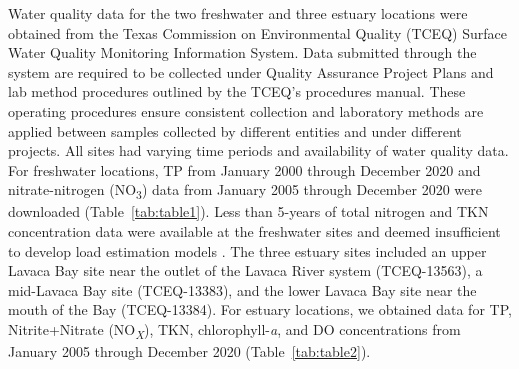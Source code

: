 \documentclass[fleqn,10pt,lineno]{wlpeerj} %
\begin{document}
Water quality data for the two freshwater and three estuary locations
were obtained from the Texas Commission on Environmental Quality (TCEQ)
Surface Water Quality Monitoring Information System. Data submitted
through the system are required to be collected under Quality Assurance
Project Plans and lab method procedures outlined by the TCEQ's
procedures manual. These operating procedures ensure consistent
collection and laboratory methods are applied between samples collected
by different entities and under different projects. All sites had
varying time periods and availability of water quality data. For
freshwater locations, TP from January 2000 through December 2020 and
nitrate-nitrogen (NO\textsubscript{3}) data from January 2005 through
December 2020 were downloaded (Table~\ref{tab:table1}). Less than
5-years of total nitrogen and TKN concentration data were available at
the freshwater sites and deemed insufficient to develop load estimation
models
\autocite{horowitzEvaluationSedimentRating2003,snelderEstimationCatchmentNutrient2017}.
The three estuary sites included an upper Lavaca Bay site near the
outlet of the Lavaca River system (TCEQ-13563), a mid-Lavaca Bay site
(TCEQ-13383), and the lower Lavaca Bay site near the mouth of the Bay
(TCEQ-13384). For estuary locations, we obtained data for TP,
Nitrite+Nitrate (NO\textsubscript{\emph{X}}), TKN, chlorophyll-\emph{a},
and DO concentrations from January 2005 through December 2020
(Table~\ref{tab:table2}).
\end{document}
